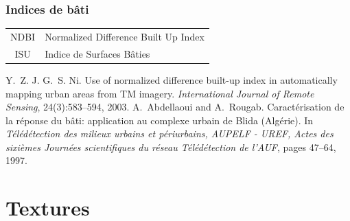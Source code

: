 \documentclass[compress]{beamer}
\begin{document}
\begin{frame}
\frametitle{Indices de bâti}
\footnotesize \centering
\begin{tabular}{|c|l|}
\hline
NDBI &  Normalized Difference Built Up Index \cite{Zha2003-NDBI} \\
ISU &  Indice de Surfaces Bâties \cite{Abdellaoui1997-ISU} \\
\hline
\end{tabular}
\begin{thebibliography}{noidea}
\tiny
{}
Y.~Z. J. G.~S. Ni.
 Use of normalized difference built-up index in automatically mapping
  urban areas from {TM} imagery.
 {\em International Journal of Remote Sensing}, 24(3):583--594,
        2003.
A.~Abdellaoui and A.~Rougab.
 Caract\'erisation de la réponse du b\^ati: application au complexe
  urbain de {B}lida ({A}lg\'erie).
 In {\em T\'el\'ed\'etection des milieux urbains et p\'eriurbains,
  AUPELF - UREF, Actes des sixi\`emes Journ\'ees scientifiques du r\'eseau
  T\'el\'ed\'etection de l'AUF}, pages 47--64, 1997.
\end{thebibliography}
\end{frame}


\section{Textures}
\end{document}
